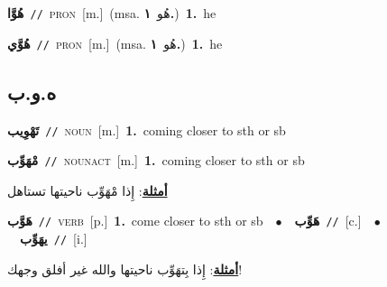 \documentclass[10pt,a4paper,twoside]{article} %
\begin{document}
\begin{multicols}{2}
{\setlength\topsep{0pt}\textbf{\foreignlanguage{arabic}{هُوَّا}}\ {\color{gray}\texttt{//}\color{black}}\ \textsc{pron}\ [m.]\ \color{gray}(msa. \foreignlanguage{arabic}{هُو}~\foreignlanguage{arabic}{\textbf{١.}})\color{black}\ \textbf{1.}~he\ } \vspace{2mm}

{\setlength\topsep{0pt}\textbf{\foreignlanguage{arabic}{هُوَّي}}\ {\color{gray}\texttt{//}\color{black}}\ \textsc{pron}\ [m.]\ \color{gray}(msa. \foreignlanguage{arabic}{هُو}~\foreignlanguage{arabic}{\textbf{١.}})\color{black}\ \textbf{1.}~he\ } \vspace{2mm}

\vspace{-3mm}
\subsection*{\color{blue}\foreignlanguage{arabic}{ه.و.ب}\color{blue}{}} 

{\setlength\topsep{0pt}\textbf{\foreignlanguage{arabic}{تَهْوِيب}}\ {\color{gray}\texttt{//}\color{black}}\ \textsc{noun}\ [m.]\ \textbf{1.}~coming closer to sth or sb\ } \vspace{2mm}

{\setlength\topsep{0pt}\textbf{\foreignlanguage{arabic}{مْهَوِّب}}\ {\color{gray}\texttt{//}\color{black}}\ \textsc{noun\textunderscore act}\ [m.]\ \textbf{1.}~coming closer to sth or sb\  \begin{flushright}\color{gray}\foreignlanguage{arabic}{\textbf{\underline{\foreignlanguage{arabic}{أمثلة}}}: إِذا مْهَوِّب ناحيتها تستاهل}\end{flushright}\color{black}} \vspace{2mm}

{\setlength\topsep{0pt}\textbf{\foreignlanguage{arabic}{هَوَّب}}\ {\color{gray}\texttt{//}\color{black}}\ \textsc{verb}\ [p.]\ \textbf{1.}~come closer to sth or sb\ \ $\bullet$\ \ \setlength\topsep{0pt}\textbf{\foreignlanguage{arabic}{هَوِّب}}\ {\color{gray}\texttt{//}\color{black}}\ [c.]\ \ $\bullet$\ \ \setlength\topsep{0pt}\textbf{\foreignlanguage{arabic}{يهَوِّب}}\ {\color{gray}\texttt{//}\color{black}}\ [i.]\  \begin{flushright}\color{gray}\foreignlanguage{arabic}{\textbf{\underline{\foreignlanguage{arabic}{أمثلة}}}: إِذا بِتهَوِّب ناحيتها والله غير أفلق وجهك!}\end{flushright}\color{black}} \vspace{2mm}


\end{multicols}
\end{document}
